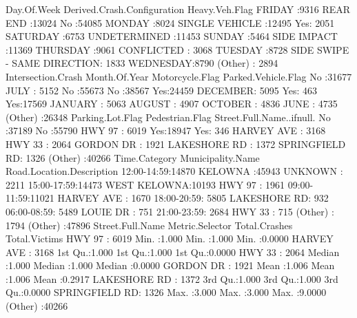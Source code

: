 \documentclass[11pt, a4paper]{article}
\begin{document}
\begin{Schunk}
\begin{Soutput}
    Day.Of.Week                Derived.Crash.Configuration Heavy.Veh.Flag
 FRIDAY   :9316   REAR END                   :13024        No :54085     
 MONDAY   :8024   SINGLE VEHICLE             :12495        Yes: 2051     
 SATURDAY :6753   UNDETERMINED               :11453                      
 SUNDAY   :5464   SIDE IMPACT                :11369                      
 THURSDAY :9061   CONFLICTED                 : 3068                      
 TUESDAY  :8728   SIDE SWIPE - SAME DIRECTION: 1833                      
 WEDNESDAY:8790   (Other)                    : 2894                      
 Intersection.Crash  Month.Of.Year   Motorcycle.Flag Parked.Vehicle.Flag
 No :31677          JULY    : 5152   No :55673       No :38567          
 Yes:24459          DECEMBER: 5095   Yes:  463       Yes:17569          
                    JANUARY : 5063                                      
                    AUGUST  : 4907                                      
                    OCTOBER : 4836                                      
                    JUNE    : 4735                                      
                    (Other) :26348                                      
 Parking.Lot.Flag Pedestrian.Flag  Street.Full.Name..ifnull.
 No :37189        No :55790       HWY 97        : 6019      
 Yes:18947        Yes:  346       HARVEY AVE    : 3168      
                                  HWY 33        : 2064      
                                  GORDON DR     : 1921      
                                  LAKESHORE RD  : 1372      
                                  SPRINGFIELD RD: 1326      
                                  (Other)       :40266      
     Time.Category      Municipality.Name Road.Location.Description
 12:00-14:59:14870   KELOWNA     :45943   UNKNOWN     : 2211       
 15:00-17:59:14473   WEST KELOWNA:10193   HWY 97      : 1961       
 09:00-11:59:11021                        HARVEY AVE  : 1670       
 18:00-20:59: 5805                        LAKESHORE RD:  932       
 06:00-08:59: 5489                        LOUIE DR    :  751       
 21:00-23:59: 2684                        HWY 33      :  715       
 (Other)    : 1794                        (Other)     :47896       
       Street.Full.Name Metric.Selector Total.Crashes   Total.Victims   
 HWY 97        : 6019   Min.   :1.000   Min.   :1.000   Min.   :0.0000  
 HARVEY AVE    : 3168   1st Qu.:1.000   1st Qu.:1.000   1st Qu.:0.0000  
 HWY 33        : 2064   Median :1.000   Median :1.000   Median :0.0000  
 GORDON DR     : 1921   Mean   :1.006   Mean   :1.006   Mean   :0.2917  
 LAKESHORE RD  : 1372   3rd Qu.:1.000   3rd Qu.:1.000   3rd Qu.:0.0000  
 SPRINGFIELD RD: 1326   Max.   :3.000   Max.   :3.000   Max.   :9.0000  
 (Other)       :40266                                                   
\end{Soutput}
\end{Schunk}
\end{document}
